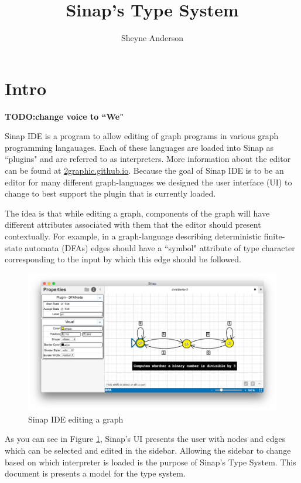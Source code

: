 \documentclass{article}
\begin{document}
\title{Sinap's Type System}
\author{Sheyne Anderson}
\maketitle
\section{Intro}

\textbf{TODO:change voice to ``We"}

Sinap IDE is a program to allow editing of graph
programs in various graph programming langauages. Each of these 
languages are loaded into Sinap as ``plugins" and are 
referred to as interpreters. More information 
about the editor can be found at 
\href{https://2graphic.github.io}{2graphic.github.io}.
Because the goal of Sinap IDE is to be an editor for many 
different graph-languages we designed the user interface (UI)
to change to best support the plugin that is currently loaded. 

The idea is that while editing a graph, components of the
graph will have different attributes associated with them 
that the editor should present contextually. For example, in
a graph-language describing deterministic finite-state 
automata (DFAs) edges should have a ``symbol" attribute of 
type character corresponding to the input by which this 
edge should be followed. 

\begin{figure}[h]
    \centering
    \includegraphics[width=.8\textwidth]{sinap-screenshot}
    \caption{Sinap IDE editing a graph}
    \label{sinap-screenshot}  
\end{figure}

As you can see in Figure \ref{sinap-screenshot}, Sinap's UI
presents the user with nodes and edges which can be selected 
and edited in the sidebar. Allowing the sidebar to change based
on which interpreter is loaded is the purpose of Sinap's Type System. 
This document is presents a model for the type system. 
    
\end{document}
